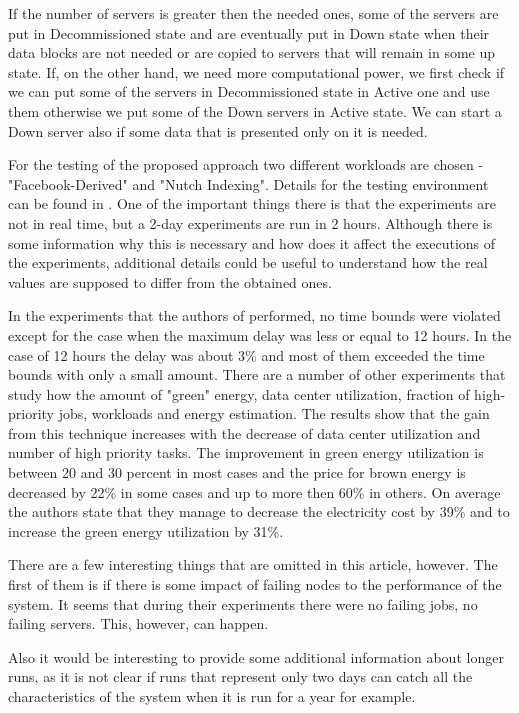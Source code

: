 \documentclass[9pt, a4paper]{article}
\theoremstyle{plain}
\begin{document}
  If the number of servers is greater then the needed ones, some of the servers
  are put in Decommissioned state and are eventually put in Down state when
  their data blocks are not needed or are copied to servers that will remain in
  some up state. If, on the other hand, we need more computational power, we
  first check if we can put some of the servers in Decommissioned state in
  Active one and use them otherwise we put some of the Down servers in Active
  state. We can start a Down server also if some data that is presented only on
  it is needed.

  For the testing of the proposed approach two different workloads are chosen -
  "Facebook-Derived" and "Nutch Indexing". Details for the testing environment
  can be found in \cite{greenhadoop}. One of the important things there is that
  the experiments are not in real time, but a 2-day experiments are run in 2
  hours. Although there is some information why this is necessary and how does
  it affect the executions of the experiments, additional details could be
  useful to understand how the real values are supposed to differ from the
  obtained ones.

  In the experiments that the authors of \cite{greenhadoop} performed, no time
  bounds were violated except for the case when the maximum delay was less or
  equal to 12 hours. In the case of 12 hours the delay was about 3\% and most of
  them exceeded the time bounds with only a small amount. There are a number of
  other experiments that study how the amount of "green" energy, data center
  utilization, fraction of high-priority jobs, workloads and energy estimation.
  The results show that the gain from this technique increases with the decrease
  of data center utilization and number of high priority tasks. The improvement
  in green energy utilization is between 20 and 30 percent in most cases and the
  price for brown energy is decreased by 22\% in some cases and up to more then
  60\% in others. On average the authors state that they manage to decrease the
  electricity cost by 39\% and to increase the green energy utilization by 31\%.

  There are a few interesting things that are omitted in this article, however.
  The first of them is if there is some impact of failing nodes to the
  performance of the system. It seems that during their experiments there were
  no failing jobs, no failing servers. This, however, can happen. 

  Also it would be interesting to provide some additional information about
  longer runs, as it is not clear if runs that represent only two days can catch
  all the characteristics of the system when it is run for a year for example.
\end{document}
